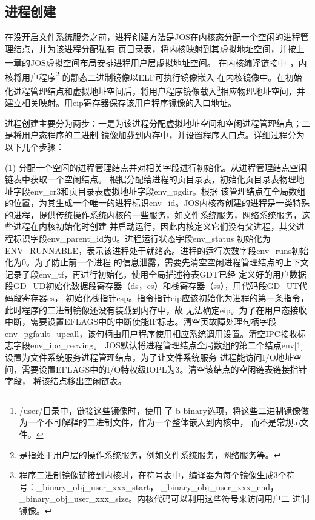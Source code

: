 \documentclass[12pt,openany,a4paper]{report}
\begin{document}
	\subsection{进程创建}
	    在没开启文件系统服务之前，进程创建方法是JOS在内核态分配一个空闲的进程管理结点，并为该进程分配私有
	页目录表，将内核映射到其虚拟地址空间，并按上一章的JOS虚拟空间布局安排进程用户层虚拟地址空间。
	在内核编译链接中\footnote{/user/目录中，链接这些镜像时，使用
	了-b binary选项，将这些二进制镜像做为一个不可解释的二进制文件，作为一个整体嵌入到内核中，
	而不是常规.o文件。}，内核将用户程序\footnote{
	是指处于用户层的操作系统服务，例如文件系统服务，网络服务等。} 的静态二进制镜像以ELF可执行镜像嵌入
	在内核镜像中。在初始化进程管理结点和虚拟地址空间后，将用户程序镜像载入\footnote{
	程序二进制镜像链接到内核时，在符号表中，编译器为每个镜像生成3个符号：\_binary\_obj\_user\_xxx\_start，
	\_binary\_obj\_user\_xxx\_end，\_binary\_obj\_user\_xxx\_size。内核代码可以利用这些符号来访问用户二
	进制镜像。}相应物理地址空间，并建立相关映射。用eip寄存器保存该用户程序镜像的入口地址。\par
	
	    进程创建主要分为两步：一是为该进程分配虚拟地址空间和空闲进程管理结点；二是将用户态程序的二进制
	镜像加载到内存中，并设置程序入口点。详细过程分为以下几个步骤：\par	
	    
	    (1) 分配一个空闲的进程管理结点并对相关字段进行初始化。从进程管理结点空闲链表中获取一个空闲结点。
	根据分配给进程的页目录表，初始化页目录表物理地址字段env\_cr3和页目录表虚拟地址字段env\_pgdir。根据
	该管理结点在全局数组的位置，为其生成一个唯一的进程标识env\_id。JOS内核态创建的进程是一类特殊
	的进程，提供传统操作系统内核的一些服务，如文件系统服务，网络系统服务，这些进程在内核初始化时创建
	并启动运行，因此内核定义它们没有父进程，其父进程标识字段env\_parent\_id为0。进程运行状态字段env\_status
	初始化为ENV\_RUNNABLE，表示该进程处于就绪态。进程的运行次数字段env\_runs初始化为0。为了防止前一个进程
	的信息泄露，需要先清空空闲进程管理结点的上下文记录子段env\_tf，再进行初始化，使用全局描述符表GDT已经
	定义好的用户数据段GD\_UD初始化数据段寄存器（ds，es）和栈寄存器（ss），用代码段GD\_UT代码段寄存器cs，
	初始化栈指针esp。指令指针eip应该初始化为进程的第一条指令，此时程序的二进制镜像还没有装载到内存中，故
	无法确定eip。为了在用户态接收中断，需要设置EFLAGS中的中断使能IF标志。清空页故障处理句柄字段
	env\_pgfault\_upcall，该句柄由用户程序使用相应系统调用设置。清空IPC接收标志字段env\_ipc\_recving。
	JOS默认将进程管理结点全局数组的第二个结点env[1]设置为文件系统服务进程管理结点，为了让文件系统服务
	进程能访问I/O地址空间，需要设置EFLAGS中的I/O特权级IOPL为3。清空该结点的空闲链表链接指针字段，
	将该结点移出空闲链表。\par
	
\end{document}
